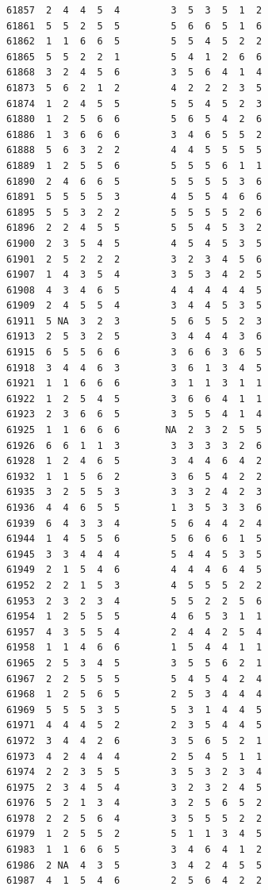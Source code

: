 \documentclass[
  letterpaper,
  DIV=11,
  numbers=noendperiod]{scrreprt}
\begin{document}
\begin{verbatim}
61857  2  4  4  5  4         3  5  3  5  1  2
61861  5  5  2  5  5         5  6  6  5  1  6
61862  1  1  6  6  5         5  5  4  5  2  2
61865  5  5  2  2  1         5  4  1  2  6  6
61868  3  2  4  5  6         3  5  6  4  1  4
61873  5  6  2  1  2         4  2  2  2  3  5
61874  1  2  4  5  5         5  5  4  5  2  3
61880  1  2  5  6  6         5  6  5  4  2  6
61886  1  3  6  6  6         3  4  6  5  5  2
61888  5  6  3  2  2         4  4  5  5  5  5
61889  1  2  5  5  6         5  5  5  6  1  1
61890  2  4  6  6  5         5  5  5  5  3  6
61891  5  5  5  5  3         4  5  5  4  6  6
61895  5  5  3  2  2         5  5  5  5  2  6
61896  2  2  4  5  5         5  5  4  5  3  2
61900  2  3  5  4  5         4  5  4  5  3  5
61901  2  5  2  2  2         3  2  3  4  5  6
61907  1  4  3  5  4         3  5  3  4  2  5
61908  4  3  4  6  5         4  4  4  4  4  5
61909  2  4  5  5  4         3  4  4  5  3  5
61911  5 NA  3  2  3         5  6  5  5  2  3
61913  2  5  3  2  5         3  4  4  4  3  6
61915  6  5  5  6  6         3  6  6  3  6  5
61918  3  4  4  6  3         3  6  1  3  4  5
61921  1  1  6  6  6         3  1  1  3  1  1
61922  1  2  5  4  5         3  6  6  4  1  1
61923  2  3  6  6  5         3  5  5  4  1  4
61925  1  1  6  6  6        NA  2  3  2  5  5
61926  6  6  1  1  3         3  3  3  3  2  6
61928  1  2  4  6  5         3  4  4  6  4  2
61932  1  1  5  6  2         3  6  5  4  2  2
61935  3  2  5  5  3         3  3  2  4  2  3
61936  4  4  6  5  5         1  3  5  3  3  6
61939  6  4  3  3  4         5  6  4  4  2  4
61944  1  4  5  5  6         5  6  6  6  1  5
61945  3  3  4  4  4         5  4  4  5  3  5
61949  2  1  5  4  6         4  4  4  6  4  5
61952  2  2  1  5  3         4  5  5  5  2  2
61953  2  3  2  3  4         5  5  2  2  5  6
61954  1  2  5  5  5         4  6  5  3  1  1
61957  4  3  5  5  4         2  4  4  2  5  4
61958  1  1  4  6  6         1  5  4  4  1  1
61965  2  5  3  4  5         3  5  5  6  2  1
61967  2  2  5  5  5         5  4  5  4  2  4
61968  1  2  5  6  5         2  5  3  4  4  4
61969  5  5  5  3  5         5  3  1  4  4  5
61971  4  4  4  5  2         2  3  5  4  4  5
61972  3  4  4  2  6         3  5  6  5  2  1
61973  4  2  4  4  4         2  5  4  5  1  1
61974  2  2  3  5  5         3  5  3  2  3  4
61975  2  3  4  5  4         3  2  3  2  4  5
61976  5  2  1  3  4         3  2  5  6  5  2
61978  2  2  5  6  4         3  5  5  5  2  2
61979  1  2  5  5  2         5  1  1  3  4  5
61983  1  1  6  6  5         3  4  6  4  1  2
61986  2 NA  4  3  5         3  4  2  4  5  5
61987  4  1  5  4  6         2  5  6  4  2  2

\end{verbatim}
\end{document}
